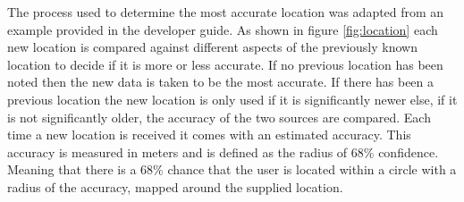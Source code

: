 The process used to determine the most accurate location was adapted from an example provided in the developer guide. As shown in figure \ref{fig:location} each new location is compared against different aspects of the previously known location to decide if it is more or less accurate. If no previous location has been noted then the new data is taken to be the most accurate. If there has been a previous location the new location is only used if it is significantly newer else, if it is not significantly older, the accuracy of the two sources are compared. Each time a new location is received it comes with an estimated accuracy. This accuracy is measured in meters and is defined as the radius of 68\% confidence\cite{location_accuracy}. Meaning that there is a 68\% chance that the user is located within a circle with a radius of the accuracy, mapped around the supplied location.

